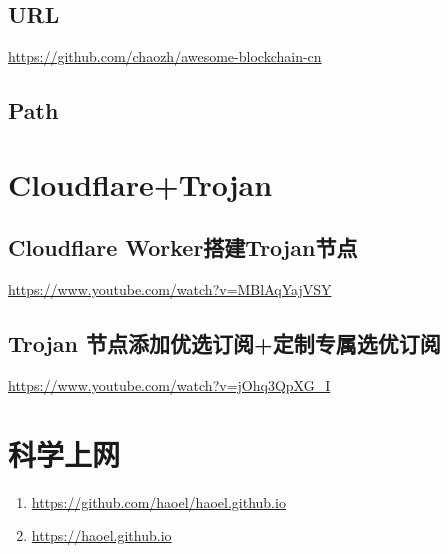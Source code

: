 \documentclass[11pt]{article}
\begin{document}
\subsection{URL}
\label{sec:org6fc8f5e}
\url{https://github.com/chaozh/awesome-blockchain-cn}
\subsection{Path}
\label{sec:org7915d45}
\section{Cloudflare+Trojan}
\label{sec:orgffed73f}
\subsection{Cloudflare Worker搭建Trojan节点}
\label{sec:orge8d0527}
\url{https://www.youtube.com/watch?v=MBlAqYajVSY}
\subsection{Trojan 节点添加优选订阅+定制专属选优订阅}
\label{sec:org7815587}
\url{https://www.youtube.com/watch?v=jOhq3QpXG\_I}


\section{科学上网}
\label{sec:orge2642e5}
\begin{enumerate}
\item \url{https://github.com/haoel/haoel.github.io}
\item \url{https://haoel.github.io}
\end{enumerate}
\end{document}
